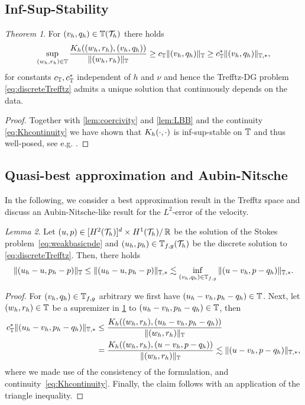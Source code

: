 \documentclass[pdflatex,sn-mathphys,Numbered]{sn-jnl}%
\theoremstyle{remark}%
\newtheorem{theorem}{Theorem}%
\newtheorem{lemma}[theorem]{Lemma}
\theoremstyle{definition}%
\begin{document}
\subsection{Inf-Sup-Stability}
\begin{theorem} \label{th:Khinfsup}
  For $(v_h,q_h) \in \mathbb{T}({\mathcal{T}_h})$ there holds
  \begin{equation}
    \sup_{(w_h,r_h) \in \mathbb{T}} \frac{K_h((w_h,r_h),(v_h,q_h))}{\Vert (w_h,r_h) \Vert_{\mathbb{T}} } \geq c_{\mathbb{T}} \Vert (v_h,q_h) \Vert_{\mathbb{T}} \geq c^\ast_{\mathbb{T}} \Vert (v_h,q_h) \Vert_{\mathbb{T},\ast},
  \end{equation}
  for constants $c_{\mathbb{T}}, c^\ast_{\mathbb{T}}$ independent of $h$ and $\nu$ and hence the Trefftz-DG problem \eqref{eq:discreteTrefftz} admits a unique solution that continuously depends on the data. 
\end{theorem}
\begin{proof}
    Together with \cref{lem:coercivity} and \cref{lem:LBB} and the continuity \eqref{eq:Khcontinuity} we have shown that $K_h(\cdot,\cdot)$ is inf-sup-stable on $\mathbb{T}$ and thus well-posed, see e.g. \cite[Lemma 1.30]{di2011mathematical}.
\end{proof}

\subsection{Quasi-best approximation and Aubin-Nitsche}
In the following, we consider a best approximation result in the Trefftz space and discuss
an Aubin-Nitsche-like result for the $L^2$-error of the velocity.

\begin{lemma}
  Let $(u,p) \in [H^{2}({\mathcal{T}_h})]^d \times H^{1}({\mathcal{T}_h}) /\, \mathbb{R}$ be
  the solution of the Stokes problem~\eqref{eq:weakbasicpde} and
  $(u_h,p_h) \in \mathbb{T}_{f,g}({\mathcal{T}_h})$ be the discrete solution to
  \eqref{eq:discreteTrefftz}. Then, there holds
  \begin{equation}
    \Vert (u_h-u,p_h-p) \Vert_{\mathbb{T}} \leq \Vert (u_h-u,p_h-p) \Vert_{\mathbb{T},\ast} \lesssim \inf_{(v_h,q_h) \in \mathbb{T}_{f,g}} \Vert (u-v_h,p-q_h) \Vert_{\mathbb{T},\ast}.
  \end{equation}
\end{lemma}
\begin{proof} For $(v_h,q_h) \in \mathbb{T}_{f,g}$ arbitrary we first have $(u_h-v_h,p_h-q_h) \in \mathbb{T}$. 
  Next, let $(w_h,r_h) \in \mathbb{T}$ be a supremizer in \cref{th:Khinfsup} to $(u_h-v_h,p_h-q_h) \in \mathbb{T}$, then
  \begin{align*}
    c^\ast_{\mathbb{T}}  \Vert (u_h-v_h,p_h-q_h) \Vert_{\mathbb{T},\ast} & \leq \frac{K_h((w_h,r_h),(u_h-v_h,p_h-q_h))}{\Vert (w_h,r_h) \Vert_{\mathbb{T}} } \\ & = \frac{K_h((w_h,r_h),(u-v_h,p-q_h))}{\Vert (w_h,r_h) \Vert_{\mathbb{T}} }
    \lesssim \Vert (u-v_h,p-q_h) \Vert_{\mathbb{T},\ast},
  \end{align*}
  where we made use of the consistency of the formulation, and continuity~\eqref{eq:Khcontinuity}. Finally, the claim follows with an application of the triangle inequality.
\end{proof}
\end{document}

